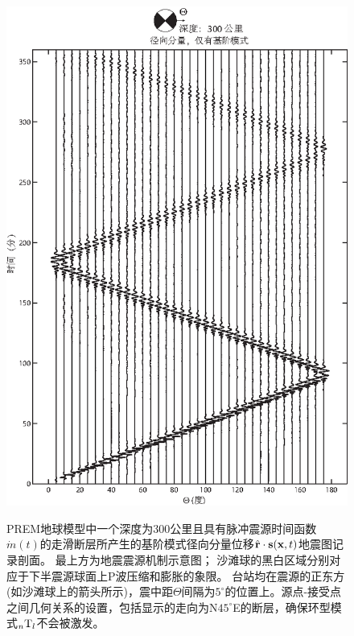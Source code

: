 \begin{figure}
\begin{center}
\scalebox{0.95}
{
\includegraphics{../figures/chap11/fig12.eps}
}
\end{center}
\caption[radial record sections n=0]{
\label{fig:11.radialsecn0}
PREM地球模型中一个深度为300公里且具有脉冲震源时间函数$\dot{m}(t)$的走滑断层所产生的基阶模式径向分量位移$\hat{\bf r}\cdot{\bf s}({\bf x},t)$地震图记录剖面。
最上方为地震震源机制示意图；
沙滩球的黑白区域分别对应于下半震源球面上P波压缩和膨胀的象限。
台站均在震源的正东方(如沙滩球上的箭头所示)，震中距$\Theta$间隔为$5^\circ$的位置上。源点-接受点之间几何关系的设置，包括显示的走向为N$45^{\circ}$E的断层，确保环型模式${}_n{\rm T}_l$不会被激发。
}
\end{figure}
